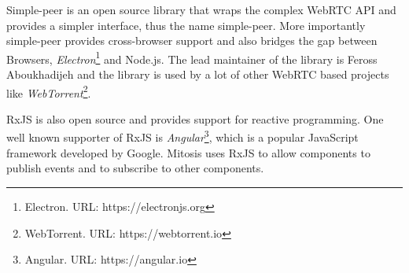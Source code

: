 Simple-peer is an open source library that wraps the complex WebRTC API and provides a simpler interface, thus the name simple-peer. More importantly simple-peer provides cross-browser support and also bridges the gap between Browsers, \textit{Electron}\footnote{Electron. URL: {https://electronjs.org}} and Node.js.
The lead maintainer of the library is Feross Aboukhadijeh and the library is used by a lot of other WebRTC based projects like \textit{WebTorrent}\footnote{WebTorrent. URL: {https://webtorrent.io}}.

RxJS is also open source and provides support for reactive programming. One well known supporter of RxJS is \textit{Angular}\footnote{Angular. URL: {https://angular.io}}, which is a popular JavaScript framework developed by Google.
Mitosis uses RxJS to allow components to publish events and to subscribe to other components.
